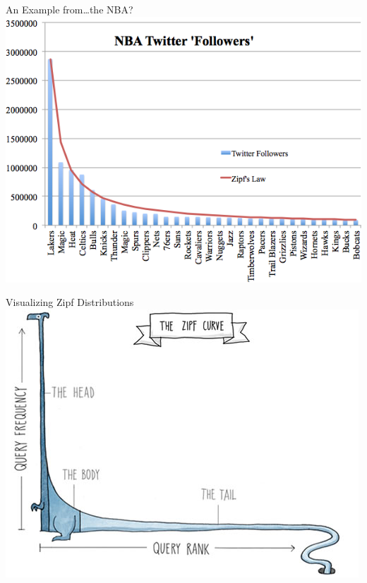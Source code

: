 \documentclass[professionalfonts, xcolor={usenames,svgnames,x11names,table}]{beamer}
\begin{document}
\begin{frame}{An Example from\ldots the NBA?}
    \includegraphics[width=.9\linewidth]{./img/zipfgraph_nba}
\end{frame}


\begin{frame}{Visualizing Zipf Distributions}
    \centering
    \includegraphics[width=.8\linewidth]{./img/zipfgraph_dinosaur}
\end{frame}
\end{document}
